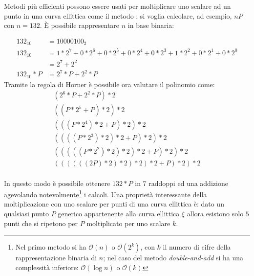 Metodi più efficienti possono essere usati per moltiplicare uno scalare ad un punto in una curva ellittica come il metodo : si voglia calcolare, ad esempio, $nP$ con $n = 132$.
È possibile rappresentare $n$ in base binaria:

\begin{equation}
    \begin{split}
        132_{10} & = 10000100_2\\
        132_{10} & = 1* 2^7 + 0 * 2^6 + 0 * 2^5 + 0 * 2^4 + 0 * 2^3 + 1 * 2^2 + 0 * 2^1 + 0 * 2^0\\
                 & = 2^7 + 2^2\\
        132_{10} * P & = 2^7 * P + 2^2 * P
    \end{split}
\end{equation}
Tramite la regola di Horner è possibile ora valutare il polinomio come:
\begin{equation}
    \begin{split}
        (2^6*P + 2^2*P)*2\\
        ((P * 2^5 + P)*2)*2\\
        (((P * 2^4)*2 + P)*2)*2\\
        ((((P * 2^3)*2)*2 + P)*2)*2\\
        (((((P * 2^2)*2)*2)*2 + P)*2)*2\\
        ((((((2P)*2)*2)*2)*2 + P)*2)*2\\
    \end{split}
\end{equation}

In questo modo è possibile ottenere $132*P$ in 7 raddoppi ed una addizione agevolando notevolmente\footnote{Nel primo metodo si ha $\mathcal{O}(n)$ o $\mathcal{O}(2^k)$, con $k$ il numero di cifre della rappresentazione binaria di $n$; nel caso del metodo \textit{double-and-add} si ha una complessità inferiore: $\mathcal{O}(\log{}n)$ o $\mathcal{O}(k)$} i calcoli.\newline
Una proprietà interessante della moltiplicazione con uno scalare per punti di una curva ellittica è: dato un qualsiasi punto $P$ generico appartenente alla curva ellittica $\xi$ allora esistono solo $5$ punti che si ripetono per $P$ moltiplicato per uno scalare $k$.

